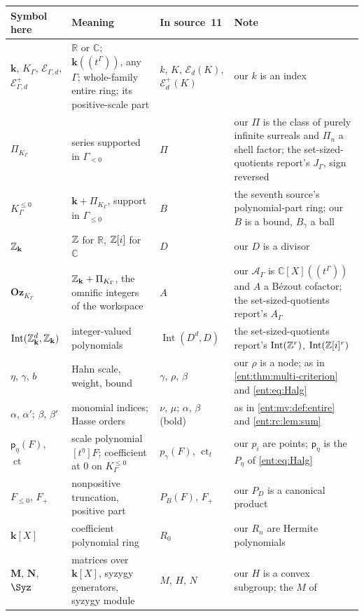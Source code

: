 \documentclass[11pt]{article}
\theoremstyle{plain}
\theoremstyle{plain}
\theoremstyle{plain}
\theoremstyle{definition}
\theoremstyle{definition}
\theoremstyle{definition}
\theoremstyle{definition}
\theoremstyle{remark}
\newcommand{\C}{\mathbb C}\newcommand{\R}{\mathbb R}
\newcommand{\K}{K_\Gamma}\newcommand{\KD}{K_\Delta}
\newcommand{\A}{\mathcal A_\Gamma}\newcommand{\OO}{\mathcal O_\Gamma}
\newcommand{\kk}{\mathbf k}\newcommand{\PP}{\mathbb P}
\newcommand{\Oz}{\mathbf{Oz}}\newcommand{\Ed}{\mathcal E_{\Gamma,d}}
\newcommand{\Kle}{K_\Gamma^{\le0}}\DeclareMathOperator{\Jac}{Jac}
\newcommand{\Zk}{\Z_{\kk}}\newcommand{\OzK}{\Oz_{\K}}
\newcommand{\PiK}{\Pi_{\K}}\newcommand{\pg}{\mathsf p}
\DeclareMathOperator{\Int}{Int}\DeclareMathOperator{\ct}{ct}
\begin{document}
\begin{center}\small
\begin{tabularx}{\textwidth}{@{}P{0.2\textwidth}P{0.3\textwidth}P{0.17\textwidth}Y@{}}
\toprule
Symbol here & Meaning & In source~11 & Note\\\midrule
$\kk$, $\K$, $\Ed$, $\Ed^{+}$ & $\R$ or $\C$; $\kk((t^\Gamma))$, any
$\Gamma$; whole-family entire ring; its positive-scale part & $k$, $K$,
$\mathcal E_d(K)$, $\mathcal E_d^+(K)$ & our $k$ is an index\\[0.3em]
$\PiK$ & series supported in $\Gamma_{<0}$ & $\Pi$ & our $\Pi$ is the class of
purely infinite surreals and $\Pi_n$ a shell factor; the
set-sized-quotients report's $J_\Gamma$, sign reversed\\[0.3em]
$\Kle$ & $\kk+\PiK$, support in $\Gamma_{\le0}$ & $B$ & the seventh source's
polynomial-part ring; our $B$ is a bound, $B_\gamma$ a ball\\[0.3em]
$\Zk$ & $\mathbb Z$ for $\R$, $\mathbb Z[i]$ for $\C$ & $D$ & our $D$ is a divisor\\[0.3em]
$\OzK$ & $\Zk+\PiK$, the omnific integers of the workspace & $A$ & our $\A$ is
$\C[X]((t^\Gamma))$ and $A$ a B\'ezout cofactor; the set-sized-quotients
report's $A_\Gamma$\\[0.3em]
$\Int(\Zk^d,\Zk)$ & integer-valued polynomials & $\Int(D^d,D)$ & the
set-sized-quotients report's $\Int(\Z^r)$, $\Int(\Z[i]^r)$\\[0.3em]
$\eta$, $\gamma$, $b$ & Hahn scale, weight, bound & $\gamma$, $\rho$, $\beta$ &
our $\rho$ is a node; as in \cref{ent:thm:multi-criterion} and
\eqref{ent:eq:Halg}\\[0.3em]
$\alpha$, $\alpha'$; $\beta$, $\beta'$ & monomial indices; Hasse orders &
$\nu$, $\mu$; $\alpha$, $\beta$ (bold) & as in \cref{ent:mv:def:entire} and
\cref{ent:rc:lem:sum}\\[0.3em]
$\pg_\eta(F)$, $\ct$ & scale polynomial $[t^\eta]F$; coefficient at $0$ on
$\Kle$ & $p_\gamma(F)$, $\operatorname{ct}_t$ & our $p_i$ are points;
$\pg_\eta$ is the $P_\eta$ of \eqref{ent:eq:Halg}\\[0.3em]
$F_{\le0}$, $F_+$ & nonpositive truncation, positive part & $P_B(F)$, $F_+$ &
our $P_D$ is a canonical product\\[0.3em]
$\kk[X]$ & coefficient polynomial ring & $R_0$ & our $R_n$ are Hermite
polynomials\\[0.3em]
$\mathbf M$, $\mathbf N$, $\Syz$ & matrices over $\kk[X]$, syzygy generators,
syzygy module & $M$, $H$, $N$ & our $H$ is a convex subgroup; the $M$ of

\end{tabularx}
\end{center}
\end{document}
